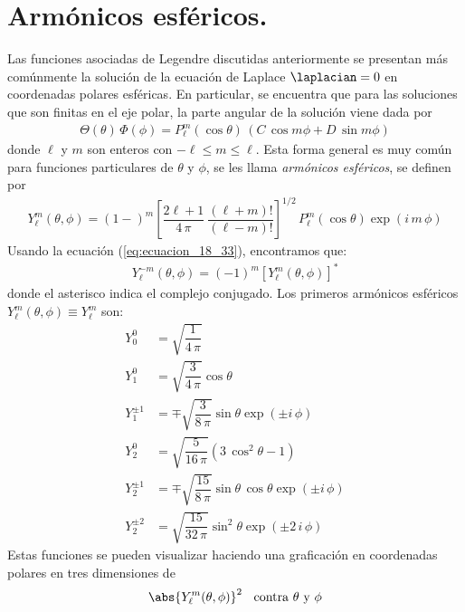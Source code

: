 \section{Armónicos esféricos.}
Las funciones asociadas de Legendre discutidas anteriormente se presentan más comúnmente la solución de la ecuación de Laplace $\laplacian =0$ en coordenadas polares esféricas. En particular, se encuentra que para las soluciones que son finitas en el eje polar, la parte angular de la solución viene dada por
\begin{align*}
\Theta (\theta) \, \Phi (\phi) = P_{\ell}^{m} (\cos \theta) \, (C \,  \cos m \phi + D \, \sin m \phi)
\end{align*}
donde $\ell$ y $m$ son enteros con $- \ell \leq m \leq \ell$. Esta forma general es muy común para funciones particulares de $\theta$ y $\phi$, se les llama \emph{armónicos esféricos}, se definen por
\begin{align}
Y_{\ell}^{m} (\theta, \phi) = (1-)^{m} \left[ \dfrac{2 \ell + 1}{4 \, \pi} \: \dfrac{(\ell + m)!}{(\ell - m)!} \right]^{1/2} \, P_{\ell}^{m} (\cos \theta) \exp(i \, m \, \phi)
\label{eq:ecuacion_18_45}
\end{align}
Usando la ecuación (\ref{eq:ecuacion_18_33}), encontramos que:
\begin{align*}
Y_{\ell}^{-m} (\theta, \phi) =  (-1)^{m} \left[ Y_{\ell}^{m} (\theta,\phi) \right]^{*}
\end{align*}
donde el asterisco indica el complejo conjugado. Los primeros armónicos esféricos $Y_{\ell}^{m}(\theta,\phi) \equiv Y_{\ell}^{m}$ son:
\begin{align*}
Y_{0}^{0} &= \sqrt{\dfrac{1}{4 \, \pi}} \\[0.5em]
Y_{1}^{0} &= \sqrt{\dfrac{3}{4 \, \pi}} \cos \theta \\[0.5em]
Y_{1}^{\pm 1} &= \mp \sqrt{\dfrac{3}{8 \, \pi}} \sin \theta \exp(\pm i \, \phi) \\[0.5em]
Y_{2}^{0} &= \sqrt{\dfrac{5}{16 \, \pi}} ( 3 \, \cos^{2} \theta - 1) \\[0.5em]
Y_{2}^{\pm 1} &= \mp \sqrt{\dfrac{15}{8 \, \pi}} \sin \theta \, \cos \theta \exp(\pm i \, \phi) \\[0.5em]
Y_{2}^{\pm 2} &= \sqrt{\dfrac{15}{32 \, \pi}} \sin^{2} \theta \exp(\pm 2 \, i \, \phi)
\end{align*}
Estas funciones se pueden visualizar haciendo una graficación en coordenadas polares en tres dimensiones de 
\begin{align*}
\abs{Y_{\ell}^{m} (\theta, \phi)}^{2} \hspace{0.2cm} \mbox{ contra } \theta \mbox{ y } \phi
\end{align*}
